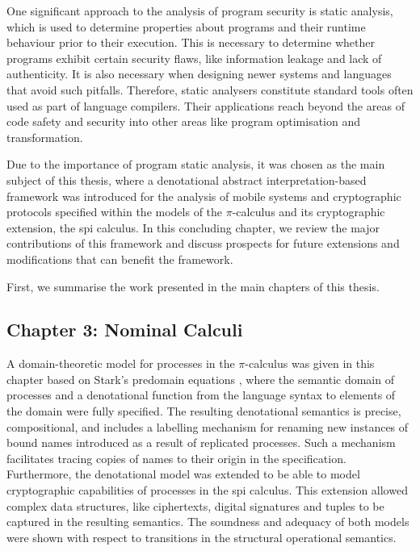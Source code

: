 \documentclass[10pt,a4paper,final,oneside,fleqn]{book}
\begin{document}
One significant approach to the analysis of program security is static analysis, which is used to determine properties about programs and their runtime behaviour prior to their execution.  This is necessary to determine whether programs exhibit certain security flaws, like information leakage and lack of authenticity.  It is also necessary when designing newer systems and languages that avoid such pitfalls.  Therefore, static analysers constitute standard tools often used as part of language compilers.  Their applications reach beyond the areas of code safety and security into other areas like program optimisation and transformation.

Due to the importance of program static analysis, it was chosen as the main subject of this thesis, where a denotational abstract interpretation-based framework was introduced for the analysis of mobile systems and cryptographic protocols specified within the models of the $\pi$-calculus and its cryptographic extension, the spi calculus.  In this concluding chapter, we review the major contributions of this framework and discuss prospects for future extensions and modifications that can benefit the framework.

First, we summarise the work presented in the main chapters of this thesis.
\subsection*{Chapter 3: Nominal Calculi}
A domain-theoretic model for processes in the $\pi$-calculus was given in this chapter based on Stark's predomain equations \cite{stark1}, where the semantic domain of processes and a denotational function from the language syntax to elements of the domain were fully specified.  The resulting denotational semantics is precise, compositional, and includes a labelling mechanism for renaming new instances of bound names introduced as a result of replicated processes. Such a mechanism facilitates tracing copies of names to their origin in the specification.  Furthermore, the denotational model was extended to be able to model cryptographic capabilities of processes in the spi calculus.  This extension allowed complex data structures, like ciphertexts, digital signatures and tuples to be captured in the resulting semantics.  The soundness and adequacy of both models were shown with respect to transitions in the structural operational semantics.
\end{document}
